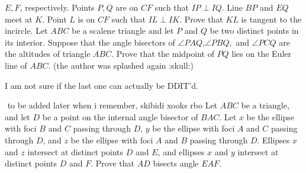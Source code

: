 \documentclass{seto}
\begin{document}
$E,F$, respectively. Points $P,Q$ are on $CF$ such that $IP\perp IQ$. Line $BP$
and $EQ$ meet at $K$. Point $L$ is on $CF$ such that $IL\perp IK$.
Prove that $KL$ is tangent to the incircle.
\exercise[TSTST 2023/6] Let $ABC$ be a scalene triangle and let $P$ and $Q$ be two distinct points in its interior. Suppose that the angle bisectors of $\angle PAQ$,$\angle PBQ,$ and $\angle PCQ$ are the altitudes of triangle $ABC$. Prove that the midpoint of $\overline{PQ}$ lies on the Euler line of $ABC$. 
(the author was splashed again :skull:)
\begin{remark}
    I am not sure if the last one can actually be DDIT'd.
\end{remark}$ $
 to be added later when i remember, skibidi xooks rbo 
\exercise[ELMO SL 2024/G8] Let $ABC$ be a triangle, 
and let $D$ be a point on the internal angle bisector of $BAC$. 
Let $x$ be the ellipse with foci $B$ and $C$ passing through $D$, 
$y$ be the ellipse with foci $A$ and $C$ passing through $D$, 
and $z$ be the ellipse with foci $A$ and $B$ passing through $D$. 
Ellipses $x$ and $z$ intersect at distinct points $D$ and $E$, 
and ellipses $x$ and $y$ intersect at distinct points $D$ and $F$. 
Prove that $AD$ bisects angle $EAF$.
\end{document}
